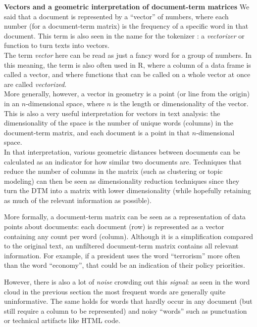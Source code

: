 \begin{feature}
  \textbf{Vectors and a geometric interpretation of document-term matrices}
  We said that a document is represented by a ``vector'' of numbers, where each number (for a document-term matrix)
  is the frequency of a specific word in that document. This term is also seen in the name for the tokenizer \sklearn:
  a \emph{vectorizer} or function to turn texts into vectors. \\%
  The term \emph{vector} here can be read as just a fancy word for a group of numbers.
  In this meaning, the term is also often used in R, where a column of a data frame is called a vector,
  and where functions that can be called on a whole vector at once are called \emph{vectorized}. \\%
  More generally, however, a vector in geometry is a point (or line from the origin) in an $n$-dimensional space,
  where $n$ is the length or dimensionality of the vector.
  This is also a very useful interpretation for vectors in text analysis:
  the dimensionality of the space is the number of unique words (columns) in the document-term matrix,
  and each document is a point in that $n$-dimensional space.\\%
  In that interpretation, various geometric distances between documents can be calculated as an indicator for how similar
  two documents are. Techniques that reduce the number of columns in the matrix (such as clustering or topic modeling)
  can then be seen as dimensionality reduction techniques since they turn the DTM into a matrix with lower dimensionality
  (while hopefully retaining as much of the relevant information as possible).
\end{feature}
\vspace{1em}

More formally, a document-term matrix can be seen as a representation of data points about documents:
each document (row) is represented as a vector containing any count per word (column).
Although it is a simplification compared to the original text,
an unfiltered document-term matrix contains all relevant information.
For example, if a president uses the word ``terrorism'' more often than the word ``economy'', that could be an indication of their policy priorities.

However, there is also a lot of \emph{noise} crowding out this \emph{signal}:
as seen in the word cloud in the previous section the most frequent words are generally quite uninformative.
The same holds for words that hardly occur in any document (but still require a column to be represented)
and noisy ``words'' such as punctuation or technical artifacts like HTML code.

